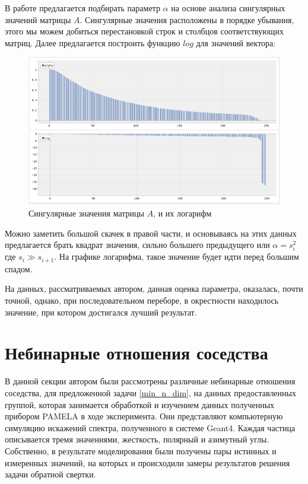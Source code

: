 \documentclass[a4paper,12pt]{diplom}
\begin{document}
В работе \cite{SvdHocker} предлагается подбирать параметр $\alpha$ на основе анализа сингулярных значений матрицы $A$. Сингулярные 
значения расположены в порядке убывания, этого мы можем добиться перестановкой строк и столбцов соответствующих матриц. Далее предлагается построить 
функцию $log$ для значений вектора:

\begin{figure}[h]
   \includegraphics[width=\linewidth]{images/alpha.png}
   \caption{ Сингулярные значения матрицы $A$, и их логарифм }
   \label{photo:alpha}
\end{figure}

Можно заметить большой скачек в правой части, и основываясь на этих данных предлагается брать квадрат значения, сильно большего предыдущего или
$\alpha = s^2_{i}$ где $ s_{i} \gg s_{i+1} $. 
На графике логарифма, такое значение будет идти перед большим спадом.

На данных, рассматриваемых автором, данная оценка параметра, оказалась, почти точной, однако, при последовательном переборе, в окрестности 
находилось значение, при котором достигался лучший результат.

\section{Небинарные отношения соседства}

В данной секции автором были рассмотрены различные небинарные отношения соседства, для предложенной задачи \eqref{min_n_dim}, на данных 
предоставленных группой, которая занимается обработкой и изучением данных полученных прибором PAMELA в ходе эксперимента. Они представляют 
компьютерную симуляцию искажений спектра, полученного в системе Geant4. Каждая частица описывается тремя значениями, жесткость, полярный и 
азимутный углы. Собственно, в результате моделирования были получены пары истинных и измеренных значений, на которых и происходили замеры 
результатов решения задачи обратной свертки.
\end{document}
